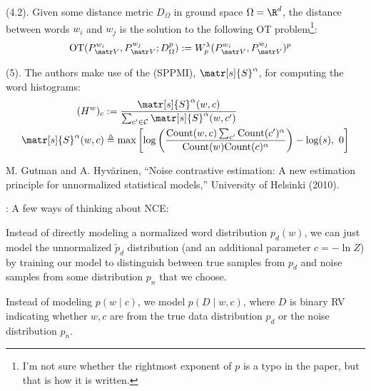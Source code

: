 \documentclass[11pt]{article}
\newcommand\myspace[1][]{\vspace{#1\bigskipamount}}
\newcommand\p{\Needspace{10\baselineskip} \noindent}
\begin{document}
\myspace
\p {} (4.2). Given some distance metric $D_{\Omega}$ in ground space $\Omega = \R^d$, the distance between words $w_i$ and $w_j$ is the solution to the following OT problem\footnote{I'm not sure whether the rightmost exponent of $p$ is a typo in the paper, but that is how it is written.}:
\begin{align}
	\text{OT}(P_{\matr V}^{w_i},  P_{\matr V}^{w_j}; D_{\Omega}^p)
		&:= W_p^{\lambda}( P_{\matr V}^{w_i},  P_{\matr V}^{w_j}  )^p
\end{align}

\myspace
\p {} (5). The authors make use of the  (SPPMI), $\matr[s]{S}^{\alpha}$, for computing the word histograms:
\begin{align}
	(H^w)_c
		&:= \frac{
			\matr[s]{S}^{\alpha}(w, c)
		}{  
			\sum_{c' \in \mathcal C} \matr[s]{S}^{\alpha}(w, c')
		}\\
	\matr[s]{S}^{\alpha}(w, c)
		&\triangleq \max \left[ 
			\log\left(  \frac{ \text{Count}(w, c) \sum_{c'} \text{Count}(c')^{\alpha} }{  \text{Count}(w)\text{Count}(c)^{\alpha}  }   \right) - \log(s),
			~0
		\right]
\end{align}




\vspace{-1em}
{\footnotesize M. Gutman and A. Hyv\"{a}rinen, ``Noise contrastive estimation: A new estimation principle for unnormalized statistical models,'' University of Helsinki  (2010).}

\p {}: A few ways of thinking about NCE:
\begin{compactitem}
	\item Instead of directly modeling a normalized word distribution $p_d(w)$, we can just model the unnormalized $\widetilde{p}_d$ distribution (and an additional parameter $c = - \ln Z$) by training our model to distinguish between true samples from $p_d$ and noise samples from some distribution $p_n$ that we choose.
	
	\item Instead of modeling $p(w \mid c)$, we model $p(D \mid w, c)$, where $D$ is binary RV indicating whether $w, c$ are from the true data distribution $p_d$ or the noise distribution $p_n$. 
\end{compactitem}
\end{document}
